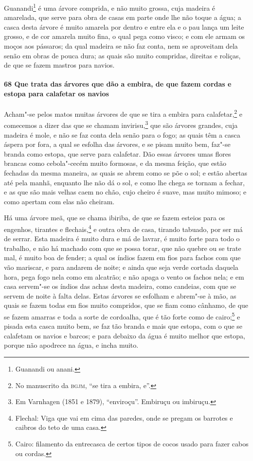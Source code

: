 Guanandi\footnote{ Guanandi ou anani.} é uma árvore comprida, e não muito grossa, cuja
madeira é amarelada, que serve para obra de casas em parte onde lhe não toque a água; a
casca desta árvore é muito amarela por dentro e entre ela e o pau lança um leite grosso, e
de cor amarela muito fina, o qual pega como visco; e com ele armam os moços aos pássaros;
da qual madeira se não faz conta, nem se aproveitam dela senão em obras de pouca dura; as
quais são muito compridas, direitas e roliças, de que se fazem mastros para navios.

\paragraph{68 Que trata das árvores que dão a embira, de que fazem cordas e estopa para
calafetar os navios}

Acham"-se pelos matos muitas árvores de que se tira a embira para calafetar,\footnote{ No
manuscrito da \textsc{bgjm}, ``se tira a embira, e''.} e comecemos a dizer das que se
chamam invirisu,\footnote{ Em Varnhagen (1851 e 1879), ``enviroçu''. Embiruçu ou
imbiruçu.} que são árvores grandes, cuja madeira é mole, e não se faz conta dela senão
para o fogo; as quais têm a casca áspera por fora, a qual se esfolha das árvores, e se
pisam muito bem, faz"-se branda como estopa, que serve para calafetar. Dão essas árvores
umas flores brancas como cebola"-cecém muito formosas, e da mesma feição, que estão
fechadas da mesma maneira, as quais se abrem como se põe o sol; e estão abertas até pela
manhã, enquanto lhe não dá o sol, e como lhe chega se tornam a fechar, e as que são mais
velhas caem no chão, cujo cheiro é suave, mas muito mimoso; e como apertam com elas não
cheiram.

Há uma árvore meã, que se chama ibiriba, de que se fazem esteios para os engenhos,
tirantes e flechais,\footnote{ Flechal: Viga que vai em cima das paredes, onde se pregam
os barrotes e caibros do teto de uma casa.} e outra obra de casa, tirando tabuado, por ser
má de serrar. Esta madeira é muito dura e má de lavrar, é muito forte para todo o
trabalho, e não há machado com que se possa torar, que não quebre ou se trate mal, é muito
boa de fender; a qual os índios fazem em fios para fachos com que vão mariscar, e para
andarem de noite; e ainda que seja verde cortada daquela hora, pega fogo nela como em
alcatrão; e não apaga o vento os fachos nela; e em casa servem"-se os índios das achas
desta madeira, como candeias, com que se servem de noite à falta delas. Estas árvores se
esfolham e abrem"-se à mão, as quais se fazem todas em fios muito compridos, que se fiam
como cânhamo, de que se fazem amarras e toda a sorte de cordoalha, que é tão forte como de
cairo;\footnote{ Cairo: filamento da entrecasca de certos tipos de cocos usado para fazer
cabos ou cordas.} e pisada esta casca muito bem, se faz tão branda e mais que estopa, com
o que se calafetam os navios e barcos; e para debaixo da água é muito melhor que estopa,
porque não apodrece na água, e incha muito.

